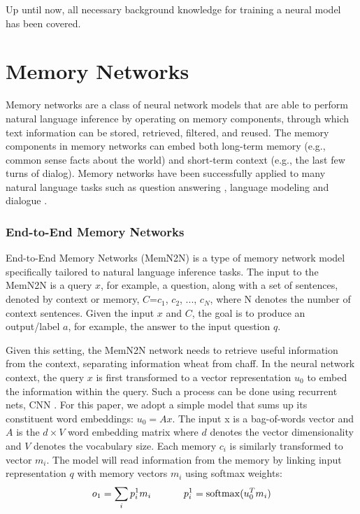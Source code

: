 Up until now, all necessary background knowledge for training a neural \sts model has been covered. 

\section{Memory Networks}
Memory networks \cite{weston2014memory,sukhbaatar2015end} are a class of neural
network
 models that are able to perform natural 
language inference by 
operating on 
 memory components, through which text information can be stored, retrieved, filtered, and reused. The memory components in memory networks
 can embed both long-term memory (e.g., common sense facts about the world) and short-term context (e.g., the last few turns of dialog).
 Memory networks have been successfully applied to many natural language  tasks such as question answering \cite{bordes2014question,weston2015towards}, 
 language modeling \cite{sukhbaatar2015end,hill2015goldilocks} and dialogue \cite{dodge2015evaluating,bordes2016learning}. 
 
\subsubsection{ End-to-End Memory Networks} 
End-to-End Memory Networks (MemN2N) is a  type of memory network model specifically tailored to  natural language inference tasks. 
The input to the MemN2N is a query $x$, for example, a question, along with a set of sentences, denoted by context or memory, $C$=$c_1$, $c_2$, ..., $c_N$, where N denotes
the number of context sentences. 
Given the input $x$ and $C$, the goal is to produce an output/label $a$, for example, the answer to the input question $q$. 

Given this setting, the MemN2N network needs to retrieve useful information from the context, separating information wheat from chaff. 
In the neural network context, 
the query $x$ is first transformed to a vector representation $u_0$ to embed  the information within  the query. 
Such a process can be done using recurrent nets, CNN \cite{krizhevsky2012imagenet,kim2014convolutional}.
For this paper, we adopt 
a simple model that
sums
 up its constituent word embeddings: $u_0=Ax$. The input x is a bag-of-words vector and $A$ is the $d\times V$ word embedding matrix where $d$ denotes the vector dimensionality and $V$ denotes the vocabulary size. Each memory $c_i$ is similarly transformed to vector $m_{i}$.
The model will read information from the memory by linking input representation $q$ with memory vectors $m_{i}$ using softmax weights:
\begin{equation}
o_1=\sum_{i}p_i^1 m_{i} ~~~~~~~~~~p_i^1=\operatorname{softmax}(u_0^T m_i)
\end{equation}


